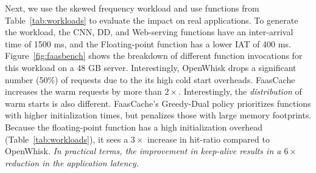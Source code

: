 

Next, we use the skewed frequency workload and use functions from Table~\ref{tab:workloads} to evaluate the impact on real applications. 
To generate the workload, the CNN, DD, and Web-serving functions have an inter-arrival time of 1500 ms, and the Floating-point function has a lower IAT of 400 ms. 
%
Figure~\ref{fig:faasbench} shows the breakdown of different function invocations for this workload on a 48 GB server.
Interestingly, OpenWhisk drops a significant number (50\%) of requests due to the its high cold start overheads.
FaasCache increases the warm requests by more than $2\times$. 
Interestingly, the \emph{distribution} of warm starts is also different. 
FaasCache's Greedy-Dual policy prioritizes functions with higher initialization times, but penalizes those with large memory footprints.
Because the floating-point function has a high initialization overhead (Table~\ref{tab:workloads}), it sees a $3\times$ increase in hit-ratio compared to OpenWhisk.
\emph{In practical terms, the improvement in keep-alive results in a $6\times$ reduction in the application latency.
}



